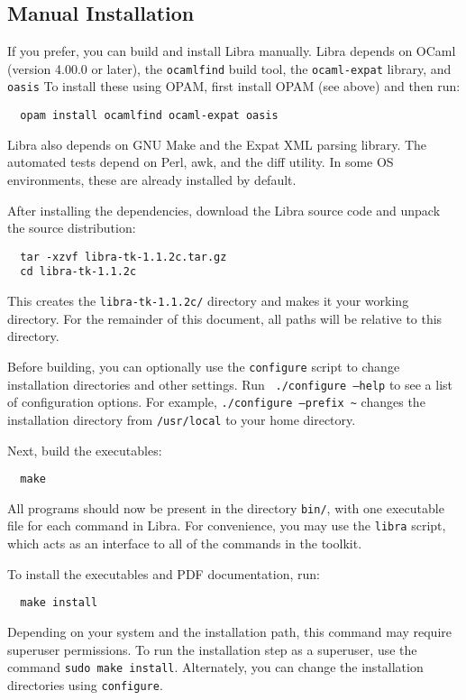 \documentclass[11pt]{article}
\begin{document}
\subsection{Manual Installation}

If you prefer, you can build and install Libra manually.  Libra
depends on OCaml (version 4.00.0 or later), the {\tt ocamlfind} build
tool, the {\tt ocaml-expat} library, and {\tt oasis}  To install these using
OPAM, first install OPAM (see above) and then run:
\begin{verbatim}
  opam install ocamlfind ocaml-expat oasis
\end{verbatim}

Libra also depends on GNU Make and the Expat XML parsing library.  The
automated tests depend on Perl, awk, and the diff utility.  In some OS
environments, these are already installed by default.

After installing the dependencies, download the Libra source code and
unpack the source distribution:
\begin{verbatim}
  tar -xzvf libra-tk-1.1.2c.tar.gz
  cd libra-tk-1.1.2c
\end{verbatim}
This creates the {\tt libra-tk-1.1.2c/} directory and makes it your
working directory.  For the remainder of this document, all paths will
be relative to this directory.

Before building, you can optionally use the {\tt configure} script to
change installation directories and other settings.  Run {\tt
./configure --help} to see a list of configuration options.  For
example, {\tt ./configure --prefix \textasciitilde{}} changes the installation
directory from {\tt /usr/local} to your home directory.

Next, build the executables:
\begin{verbatim}
  make
\end{verbatim}
All programs should now be present in the directory {\tt bin/}, with
one executable file for each command in Libra.  For convenience, you
may use the {\tt libra} script, which acts as an interface to all of
the commands in the toolkit.

To install the executables and PDF documentation, run:
\begin{verbatim}
  make install
\end{verbatim}
Depending on your system and the installation path, this command may
require super\-user permissions.  To run the installation step as a
super\-user, use the command {\tt sudo make install}.  Alternately,
you can change the installation directories using {\tt configure}.
\end{document}
